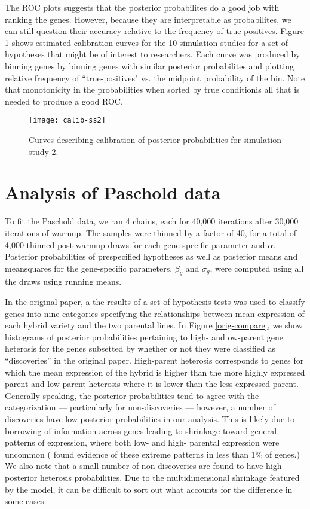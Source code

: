 The ROC plots suggests that the posterior probabilites do a good job with ranking the genes. However, because they are interpretable as probabilites, we can still question their accuracy relative to the frequency of true positives. Figure \ref{calib-ss2} shows estimated calibration curves for the 10 simulation studies for a set of hypotheses that might be of interest to researchers. Each curve was produced by binning genes by binning genes with similar posterior probabilites and plotting relative frequency of ``true-positives" vs. the midpoint probability of the bin. Note that monotonicity in the probabilities when sorted by true conditionis all that is needed to produce a good ROC.

\begin{figure}[ht!]
\centering
\texttt{[image: calib-ss2]}
\caption{Curves describing calibration of posterior probabilities for simulation study 2.}
\label{calib-ss2}
\end{figure}

\section{Analysis of Paschold data}
\label{analysis}
To fit the Paschold data, we ran 4 chains, each for 40,000 iterations after 30,000 iterations of warmup. The samples were thinned by a factor of 40, for a total of 4,000 thinned post-warmup draws for each gene-specific parameter and $\alpha$. Posterior probabilities of prespecified hypotheses as well as posterior means and meansquares for the gene-specific parameters, $\beta_g$ and $\sigma_g$, were computed using all the draws using running means.

In the original paper, a the results of a set of hypothesis tests was used to classify genes into nine categories specifying the relationships between mean expression of each hybrid variety and the two parental lines. In Figure \ref{orig-compare}, we show histograms of posterior probabilities pertaining to high- and ow-parent gene heterosis for the genes subsetted by whether or not they were classified as ``discoveries'' in the original paper. High-parent heterosis corresponds to genes for which the mean expression of the hybrid is higher than the more highly expressed parent and low-parent heterosis where it is lower than the less expressed parent. Generally speaking, the posterior probabilities tend to agree with the categorization --- particularly for non-discoveries --- however, a number of discoveries have low posterior probabilities in our analysis. This is likely due to borrowing of information across genes leading to shrinkage toward general patterns of expression, where both low- and high- parental expression were uncommon (\citet{paschold} found evidence of these extreme patterns in less than 1\% of genes.) We also note that a small number of non-discoveries are found to have high-posterior heterosis probabilities. Due to the multidimensional shrinkage featured by the model, it can be difficult to sort out what accounts for the difference in some cases.

